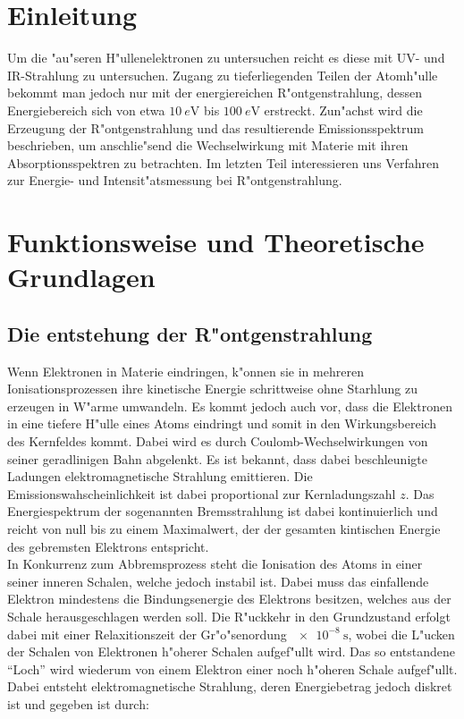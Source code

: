 \section{Einleitung}
\label{sec:einleitung}
	Um die "au"seren H"ullenelektronen zu untersuchen reicht es diese mit UV- und IR-Strahlung zu untersuchen. Zugang zu tieferliegenden Teilen der Atomh"ulle bekommt man jedoch nur mit der energiereichen R"ontgenstrahlung, dessen Energiebereich sich von etwa $\SI{10}{e\volt}$ bis $\SI{100}{e\volt}$ erstreckt.
	\vspace{0.3cm}
	Zun"achst wird die Erzeugung der R"ontgenstrahlung und das resultierende Emissionsspektrum beschrieben, um anschlie"send die Wechselwirkung mit Materie mit ihren Absorptionsspektren zu betrachten. Im letzten Teil interessieren uns Verfahren zur Energie- und Intensit"atsmessung bei R"ontgenstrahlung.

\section{Funktionsweise und Theoretische Grundlagen}
\label{sec:funktionsweise}

	
	\subsection{Die entstehung der R"ontgenstrahlung}
	\label{sub:entstehung}

		Wenn Elektronen in Materie eindringen, k"onnen sie in mehreren Ionisationsprozessen ihre kinetische Energie schrittweise ohne Starhlung zu erzeugen in W"arme umwandeln.
		Es kommt jedoch auch vor, dass die Elektronen in eine tiefere H"ulle eines Atoms eindringt und somit in den Wirkungsbereich des Kernfeldes kommt.
		Dabei wird es durch Coulomb-Wechselwirkungen von seiner geradlinigen Bahn abgelenkt.
		Es ist bekannt, dass dabei beschleunigte Ladungen elektromagnetische Strahlung emittieren.
		Die E\-mis\-sions\-wah\-schein\-lich\-keit ist dabei proportional zur Kernladungszahl $z$.
		Das Energiespektrum der sogenannten Bremsstrahlung ist dabei kontinuierlich und reicht von null bis zu einem Maximalwert, der der gesamten kintischen Energie des gebremsten Elektrons entspricht.
		\\
		In Konkurrenz zum Abbremsprozess steht die Ionisation des Atoms in einer seiner inneren Schalen, welche jedoch instabil ist.
		Dabei muss das einfallende Elektron mindestens die Bindungsenergie des Elektrons besitzen, welches aus der Schale herausgeschlagen werden soll.
		Die R"uckkehr in den Grundzustand erfolgt dabei mit einer Relaxitionszeit der Gr"o"senordung $\SI{e-8}{\second}$, wobei die L"ucken der Schalen von Elektronen h"oherer Schalen aufgef"ullt wird. 
		Das so entstandene "`Loch"' wird wiederum von einem Elektron einer noch h"oheren Schale aufgef"ullt.
		Dabei entsteht elektromagnetische Strahlung, deren Energiebetrag jedoch diskret ist und gegeben ist durch:

